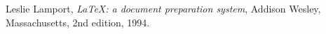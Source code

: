 \documentclass[preprint,12pt]{elsarticle}
\begin{document}








\begin{thebibliography}{00}


  Leslie Lamport,
  \textit{\LaTeX: a document preparation system},
  Addison Wesley, Massachusetts,
  2nd edition,
  1994.

\end{thebibliography}



\end{document}
